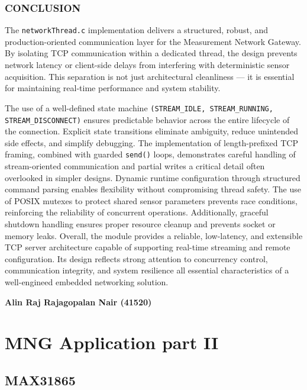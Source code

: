 \clearpage
\subsection{CONCLUSION}
The \texttt{networkThread.c} implementation delivers a structured, robust, and production-oriented communication layer for the Measurement Network Gateway. By isolating TCP communication within a dedicated thread, the design prevents network latency or client-side delays from interfering with deterministic sensor acquisition. This separation is not just architectural cleanliness — it is essential for maintaining real-time performance and system stability.

The use of a well-defined state machine \texttt{(STREAM\_IDLE, STREAM\_RUNNING, STREAM\_DISCONNECT)} ensures predictable behavior across the entire lifecycle of the connection. Explicit state transitions eliminate ambiguity, reduce unintended side effects, and simplify debugging. The implementation of length-prefixed TCP framing, combined with guarded \texttt{send()} loops, demonstrates careful handling of stream-oriented communication and partial writes a critical detail often overlooked in simpler designs.
Dynamic runtime configuration through structured command parsing enables flexibility without compromising thread safety. The use of POSIX mutexes to protect shared sensor parameters prevents race conditions, reinforcing the reliability of concurrent operations. Additionally, graceful shutdown handling ensures proper resource cleanup and prevents socket or memory leaks.
Overall, the module provides a reliable, low-latency, and extensible TCP server architecture capable of supporting real-time streaming and remote configuration. Its design reflects strong attention to concurrency control, communication integrity, and system resilience all essential characteristics of a well-engineed embedded networking solution.

\clearpage 
\null 
\vfill 
\begin{center}
\textbf{\large Alin Raj Rajagopalan Nair (41520)}
\end{center}
\vfill 
{}
\clearpage

\chapter{MNG Application part II}
\section{MAX31865}
